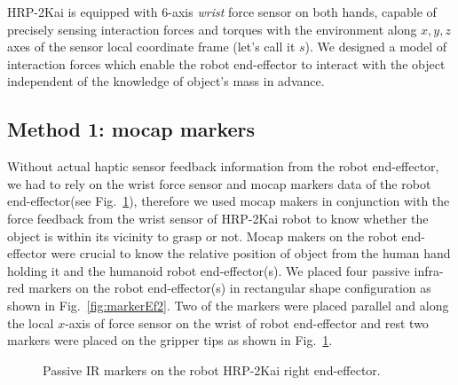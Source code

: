 HRP-2Kai is equipped with 6-axis \textit{wrist} force sensor on both hands, capable of precisely sensing interaction forces and torques with the environment along $x, y, z$ axes of the sensor local coordinate frame (let's call it $s$). We designed a model of interaction forces which enable the robot end-effector to interact with the object independent of the knowledge of object's mass in advance.

\subsection{Method 1: mocap markers}
Without actual haptic sensor feedback information from the robot end-effector, we had to rely on the wrist force sensor and mocap markers data of the robot end-effector(see Fig.~\ref{fig:markerEf}), therefore we used mocap makers in conjunction with the force feedback from the wrist sensor of HRP-2Kai robot to know whether the object is within its vicinity to grasp or not. Mocap makers on the robot end-effector were crucial to know the relative position of object from the human hand holding it and the humanoid robot end-effector(s). We placed four passive infra-red markers on the robot end-effector(s) in rectangular shape configuration as shown in Fig.~\ref{fig:markerEf2}. Two of the markers were placed parallel and along the local $x$-axis of force sensor on the wrist of robot end-effector and rest two markers were placed on the gripper tips as shown in Fig.~\ref{fig:markerEf}.

\begin{figure}[ht]
	\caption{Passive IR markers on the robot HRP-2Kai right end-effector.}
	\label{fig:markerEf}
\end{figure} 


